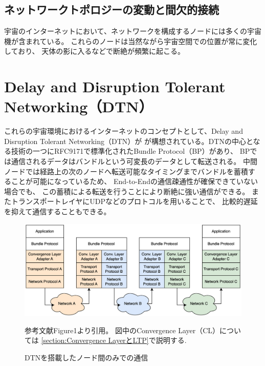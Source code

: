 \subsection{ネットワークトポロジーの変動と間欠的接続}
\label{section:ネットワークトポロジーの変動と間欠的接続}
宇宙のインターネットにおいて、ネットワークを構成するノードには多くの宇宙機が含まれている。
これらのノードは当然ながら宇宙空間での位置が常に変化しており、
 天体の影に入るなどで断絶が頻繁に起こる。 

\section{Delay and Disruption Tolerant Networking（DTN）}
これらの宇宙環境におけるインターネットのコンセプトとして、Delay and Disruption Tolerant Networking（DTN）が
が構想されている。DTNの中心となる技術の一つにRFC9171\cite{rfc9171}で標準化されたBundle Protocol（BP）があり、 
BPでは通信されるデータはバンドルという可変長のデータとして転送される。 
中間ノードでは経路上の次のノードへ転送可能なタイミングまでバンドルを蓄積することが可能になっているため、 
End-to-Endの通信疎通性が確保できていない場合でも、 この蓄積による転送を行うことにより断絶に強い通信ができる。
またトランスポートレイヤにUDPなどのプロトコルを用いることで、 比較的遅延を抑えて通信することもできる。\cite{bundle_protocol_architecture}


\begin{figure}[tbh]
    \centering
    \includegraphics[width=0.7\textheight]{img/dtnprotocolstack.pdf}
    \caption{DTNを搭載したノード間のみでの通信}
    \label{fig:dtnprotocolstack}
    \begin{minipage}{\textwidth}
        \raggedright
        \vspace{3mm}
        参考文献\cite{bundle_protocol_architecture}Figure1より引用。
        図中のConvergence Layer（CL）については
        \ref{section:Convergence LayerとLTP}で説明する.
    \end{minipage}
\end{figure}

